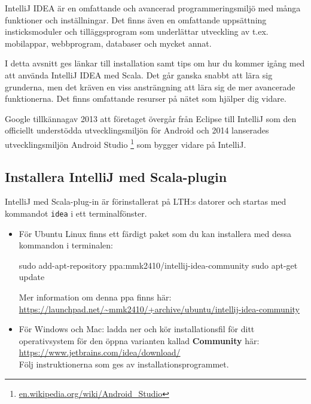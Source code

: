 IntelliJ IDEA är en omfattande och avancerad programmeringsmiljö med många funktioner och inställningar. Det finns även en omfattande uppsättning insticksmoduler och tilläggsprogram som underlättar utveckling av t.ex. mobilappar, webbprogram, databaser och mycket annat. 

I detta avsnitt ges länkar till installation samt tips om hur du kommer igång med att använda IntelliJ IDEA med Scala. Det går ganska snabbt att lära sig grunderna, men det kräven en viss ansträngning att lära sig de mer avancerade funktionerna. Det finns omfattande resurser på nätet som hjälper dig vidare. 

Google tillkännagav 2013 att företaget övergår från Eclipse till IntelliJ som den officiellt understödda utvecklingsmiljön för Android och 2014 lanserades utvecklingsmiljön Android Studio%
\footnote {\href{https://en.wikipedia.org/wiki/Android_Studio}{en.wikipedia.org/wiki/Android\_Studio}}
 som bygger vidare på IntelliJ. 

\subsection{Installera IntelliJ med Scala-plugin}\label{appendix:ide:intellij:install}

IntelliJ med Scala-plug-in är förinstallerat på LTH:s datorer och startas med kommandot \texttt{idea} i ett terminalfönster.

\begin{itemize}
\item För Ubuntu Linux finns ett färdigt paket som du kan installera med dessa kommandon i terminalen: 
\begin{REPLnonum}
sudo add-apt-repository ppa:mmk2410/intellij-idea-community
sudo apt-get update
\end{REPLnonum}
Mer information om denna ppa finns här:\\ \url{https://launchpad.net/~mmk2410/+archive/ubuntu/intellij-idea-community}\item För Windows och Mac: ladda ner och kör installationsfil för ditt operativsystem för den öppna varianten kallad \textbf{Community} här: \\
\url{https://www.jetbrains.com/idea/download/} \\
Följ instruktionerna som ges av installationsprogrammet.
\end{itemize}


